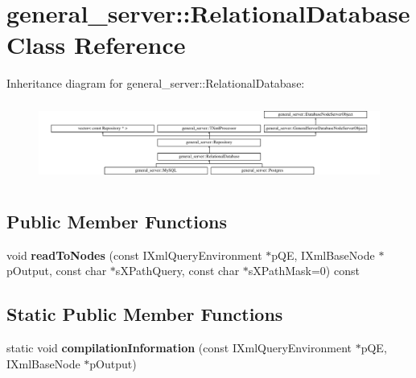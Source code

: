 \hypertarget{classgeneral__server_1_1RelationalDatabase}{\section{general\-\_\-server\-:\-:\-Relational\-Database \-Class \-Reference}
\label{classgeneral__server_1_1RelationalDatabase}
}
\-Inheritance diagram for general\-\_\-server\-:\-:\-Relational\-Database\-:\begin{figure}[H]
\begin{center}
\leavevmode
\includegraphics[height=2.621723cm]{classgeneral__server_1_1RelationalDatabase}
\end{center}
\end{figure}
\subsection*{\-Public \-Member \-Functions}
\begin{DoxyCompactItemize}
\item 
\hypertarget{classgeneral__server_1_1RelationalDatabase_ab283218988694a501af7f21f72351939}{void {\bfseries read\-To\-Nodes} (const \-I\-Xml\-Query\-Environment $\ast$p\-Q\-E, \-I\-Xml\-Base\-Node $\ast$p\-Output, const char $\ast$s\-X\-Path\-Query, const char $\ast$s\-X\-Path\-Mask=0) const }\label{classgeneral__server_1_1RelationalDatabase_ab283218988694a501af7f21f72351939}

\end{DoxyCompactItemize}
\subsection*{\-Static \-Public \-Member \-Functions}
\begin{DoxyCompactItemize}
\item 
\hypertarget{classgeneral__server_1_1RelationalDatabase_ad9687a491b367b6925c1bc18c6e2df0a}{static void {\bfseries compilation\-Information} (const \-I\-Xml\-Query\-Environment $\ast$p\-Q\-E, \-I\-Xml\-Base\-Node $\ast$p\-Output)}\label{classgeneral__server_1_1RelationalDatabase_ad9687a491b367b6925c1bc18c6e2df0a}

\end{DoxyCompactItemize}
